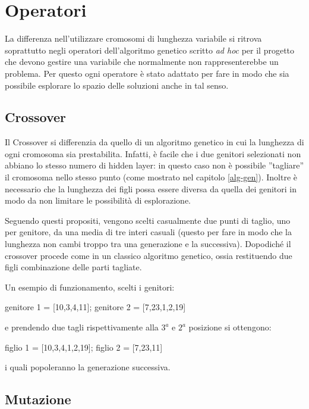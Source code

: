 \documentclass[12pt,a4paper]{report}
\begin{document}
\section{Operatori}

La differenza nell'utilizzare cromosomi di lunghezza variabile si ritrova soprattutto negli operatori dell'algoritmo genetico scritto \textit{ad hoc} per il progetto che devono gestire una variabile che normalmente non rappresenterebbe un problema. 
Per questo ogni operatore è stato adattato per fare in modo che sia possibile esplorare lo spazio delle soluzioni anche in tal senso.

\subsection{Crossover}

Il Crossover si differenzia da quello di un algoritmo genetico in cui la lunghezza di ogni cromosoma sia prestabilita. 
Infatti, è facile che i due genitori selezionati non abbiano lo stesso numero di hidden layer: in questo caso non è possibile ''tagliare'' il cromosoma nello stesso punto (come mostrato nel capitolo \ref{alg-gen}).
Inoltre è necessario che la lunghezza dei figli possa essere diversa da quella dei genitori in modo da non limitare le possibilità di esplorazione.

Seguendo questi propositi, vengono scelti casualmente due punti di taglio, uno per genitore, da una media di tre interi casuali (questo per fare in modo che la lunghezza non cambi troppo tra una generazione e la successiva).
Dopodiché il crossover procede come in un classico algoritmo genetico, ossia restituendo due figli combinazione delle parti tagliate.

Un esempio di funzionamento, scelti i genitori:

\begin{center}
 genitore 1 = [10,3,4,11];  genitore 2 = [7,23,1,2,19]\\
\end{center}

e prendendo due tagli rispettivamente alla $3^{a}$ e $2^{a}$ posizione si ottengono:

\begin{center}
 figlio 1 = [10,3,4,1,2,19]; figlio 2 = [7,23,11]
\end{center}

i quali popoleranno la generazione successiva.

\subsection{Mutazione}
\end{document}
